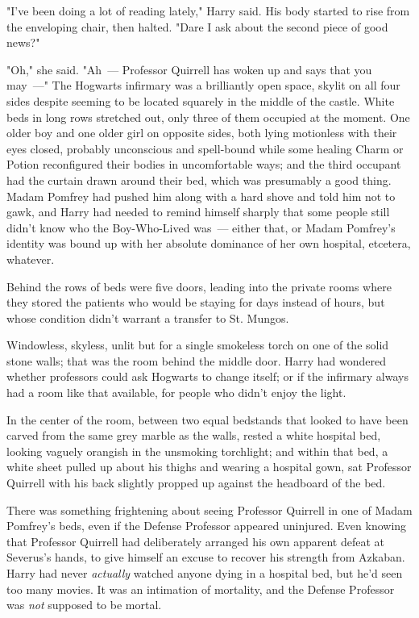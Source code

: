 "I've been doing a lot of reading lately," Harry said. His body started to rise
from the enveloping chair, then halted. "Dare I ask about the second piece of
good news?"

"Oh," she said. "Ah~--- Professor Quirrell has woken up and says that you may~---"
\sbreak
The Hogwarts infirmary was a brilliantly open space, skylit on all four sides
despite seeming to be located squarely in the middle of the castle. White beds
in long rows stretched out, only three of them occupied at the moment. One
older boy and one older girl on opposite sides, both lying motionless with
their eyes closed, probably unconscious and spell-bound while some healing
Charm or Potion reconfigured their bodies in uncomfortable ways; and the third
occupant had the curtain drawn around their bed, which was presumably a good
thing. Madam Pomfrey had pushed him along with a hard shove and told him not to
gawk, and Harry had needed to remind himself sharply that some people still
didn't know who the Boy-Who-Lived was~--- either that, or Madam Pomfrey's
identity was bound up with her absolute dominance of her own hospital,
etcetera, whatever.

Behind the rows of beds were five doors, leading into the private rooms where
they stored the patients who would be staying for days instead of hours, but
whose condition didn't warrant a transfer to St. Mungos.

Windowless, skyless, unlit but for a single smokeless torch on one of the solid
stone walls; that was the room behind the middle door. Harry had wondered
whether professors could ask Hogwarts to change itself; or if the infirmary
always had a room like that available, for people who didn't enjoy the light.

In the center of the room, between two equal bedstands that looked to have been
carved from the same grey marble as the walls, rested a white hospital bed,
looking vaguely orangish in the unsmoking torchlight; and within that bed, a
white sheet pulled up about his thighs and wearing a hospital gown, sat
Professor Quirrell with his back slightly propped up against the headboard of
the bed.

There was something frightening about seeing Professor Quirrell in one of Madam
Pomfrey's beds, even if the Defense Professor appeared uninjured. Even knowing
that Professor Quirrell had deliberately arranged his own apparent defeat at
Severus's hands, to give himself an excuse to recover his strength from
Azkaban. Harry had never \emph{actually} watched anyone dying in a hospital
bed, but he'd seen too many movies. It was an intimation of mortality, and the
Defense Professor was \emph{not} supposed to be mortal.

